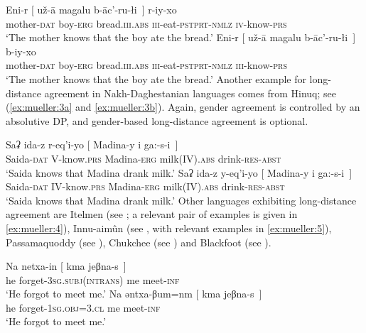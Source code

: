 \documentclass[output=paper
,modfonts
,nonflat]{langsci/langscibook}
\begin{document}
	\ea\label{ex:mueller:2}
	\ea \label{ex:mueller:2a}
	\gll     Eni-r [\sub{$\alpha$} u\v{z}-\={a} magalu b-\={a}c'-ru-\l i~] r-iy-xo \\
	mother-{\scshape dat} {} boy-{\scshape erg} bread.{\scshape iii.abs} {\scshape iii}-eat-{\scshape pstprt-nmlz} {\scshape iv}-know-{\scshape prs} \\
	\glt     `The mother knows that the boy ate the bread.'\newpage
	\ex \label{ex:mueller:2b}
	\gll     Eni-r [\sub{$\alpha$} u\v{z}-\={a} \label{2-b}magalu b-\={a}c'-ru-\l i~] b-iy-xo \\
	mother-{\scshape dat} {} boy-{\scshape erg} bread.{\scshape iii.abs} {\scshape iii}-eat-{\scshape pstprt-nmlz} {\scshape iii}-know-{\scshape prs} \\
	\glt      `The mother knows that the boy ate the bread.'
	\z
	\z
	Another example for long-distance agreement in Nakh-Daghestanian
	languages comes from Hinuq; see (\ref{ex:mueller:3a} and \ref{ex:mueller:3b}). 
	Again, gender agreement is controlled by an
	absolutive DP, and gender-based long-distance agreement is optional.
	
	\ea\label{ex:mueller:3} \citep{Forker:11}
	\ea \label{ex:mueller:3a}
	\gll Saʡ ida-z r-eq'i-yo [\sub{$\alpha$} Madina-y \textgamma i ga:-s-\textbeltl i~] \\
	Saida-{\scshape dat} {V}-know.{\scshape prs} {} Madina-{\scshape erg} milk(IV).{\scshape abs} drink-{\scshape res-abst} \\ 
	\glt `Saida knows that Madina drank milk.'
	\ex \label{ex:mueller:3b}
	\gll  Saʡ ida-z y-eq'i-yo [\sub{$\alpha$} \label{3-b}Madina-y \textgamma i ga:-s-\textbeltl i~] \\
	Saida-{\scshape dat} {IV}-know.{\scshape prs} {} Madina-{\scshape erg} milk({IV}).{\scshape abs} drink-{\scshape res-abst} \\
	\glt  `Saida knows that Madina drank milk.'
	\z
	\z
	Other languages exhibiting long-distance agreement are Itelmen (see
	\citealt{BobaljikWurmbrand:05}; a relevant pair of examples is given in
	\ref{ex:mueller:4}), Innu-aim\^{u}n (see \citealt{BraniganMacKenzie:02}, with
	relevant examples in \ref{ex:mueller:5}), Passamaquoddy (see \citealt{Bruening:01}),
	Chukchee (see \citealt{Boskovic:07}) and Blackfoot (see \citealt{Bliss:09}).
	
	\ea\label{ex:mueller:4}
	\ea 
	\gll Na netxa-in [\sub{$\alpha$} kma jeβna-s~] \\
	he forget-{{\scshape 3sg.subj(intrans)}} {} me meet-{\scshape inf} \\
	\glt  `He forgot to meet me.'
	\ex
	\gll Na əntxa-βum=nm [\sub{$\alpha$} kma jeβna-s~] \\
	he forget-{{\scshape 1sg.obj=3.cl}} {} {me} meet-{\scshape inf} \\
	\glt `He forgot to meet me.'
	\z
	\z
	
\end{document}

